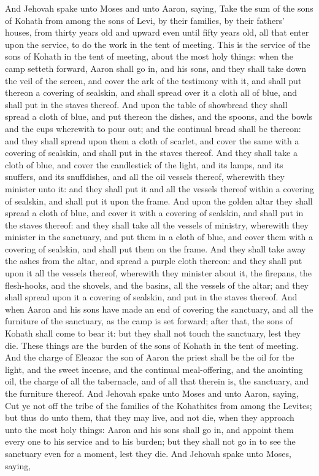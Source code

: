 And Jehovah spake unto Moses and unto Aaron, saying, Take the sum of the sons of Kohath from among the sons of Levi, by their families, by their fathers’ houses, from thirty years old and upward even until fifty years old, all that enter upon the service, to do the work in the tent of meeting. This is the service of the sons of Kohath in the tent of meeting, about the most holy things: when the camp setteth forward, Aaron shall go in, and his sons, and they shall take down the veil of the screen, and cover the ark of the testimony with it, and shall put thereon a covering of sealskin, and shall spread over it a cloth all of blue, and shall put in the staves thereof. And upon the table of showbread they shall spread a cloth of blue, and put thereon the dishes, and the spoons, and the bowls and the cups wherewith to pour out; and the continual bread shall be thereon: and they shall spread upon them a cloth of scarlet, and cover the same with a covering of sealskin, and shall put in the staves thereof. And they shall take a cloth of blue, and cover the candlestick of the light, and its lamps, and its snuffers, and its snuffdishes, and all the oil vessels thereof, wherewith they minister unto it: and they shall put it and all the vessels thereof within a covering of sealskin, and shall put it upon the frame. And upon the golden altar they shall spread a cloth of blue, and cover it with a covering of sealskin, and shall put in the staves thereof: and they shall take all the vessels of ministry, wherewith they minister in the sanctuary, and put them in a cloth of blue, and cover them with a covering of sealskin, and shall put them on the frame. And they shall take away the ashes from the altar, and spread a purple cloth thereon: and they shall put upon it all the vessels thereof, wherewith they minister about it, the firepans, the flesh-hooks, and the shovels, and the basins, all the vessels of the altar; and they shall spread upon it a covering of sealskin, and put in the staves thereof. And when Aaron and his sons have made an end of covering the sanctuary, and all the furniture of the sanctuary, as the camp is set forward; after that, the sons of Kohath shall come to bear it: but they shall not touch the sanctuary, lest they die. These things are the burden of the sons of Kohath in the tent of meeting. And the charge of Eleazar the son of Aaron the priest shall be the oil for the light, and the sweet incense, and the continual meal-offering, and the anointing oil, the charge of all the tabernacle, and of all that therein is, the sanctuary, and the furniture thereof.  And Jehovah spake unto Moses and unto Aaron, saying, Cut ye not off the tribe of the families of the Kohathites from among the Levites; but thus do unto them, that they may live, and not die, when they approach unto the most holy things: Aaron and his sons shall go in, and appoint them every one to his service and to his burden; but they shall not go in to see the sanctuary even for a moment, lest they die.  And Jehovah spake unto Moses, saying, 